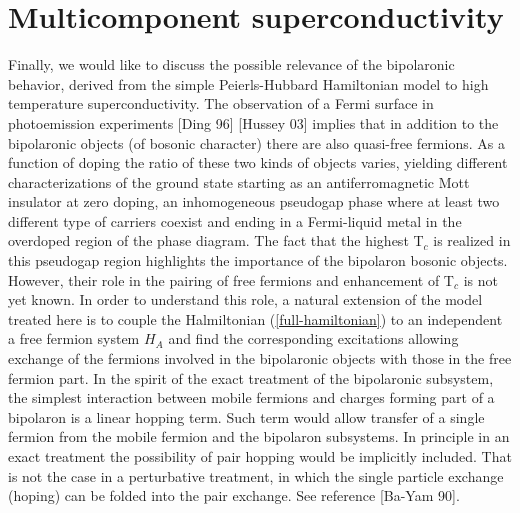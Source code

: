 \section{Multicomponent superconductivity}

Finally, we would like to discuss the possible relevance of the bipolaronic behavior, derived from the simple Peierls-Hubbard Hamiltonian model to high temperature superconductivity. The observation of a Fermi surface in photoemission experiments [Ding 96] [Hussey 03] implies that in addition to the bipolaronic objects (of bosonic character) there are also quasi-free fermions. As a function of doping the ratio of these two kinds of objects varies, yielding different characterizations of the ground state starting as an antiferromagnetic Mott insulator at zero doping, an inhomogeneous pseudogap phase where at least two different type of carriers coexist and ending in a Fermi-liquid metal in the overdoped region of the phase diagram. The fact that the highest T$_c$  is realized in this pseudogap region highlights the importance of the bipolaron bosonic objects. However, their role in the pairing of free fermions and enhancement of T$_c$ is not yet known. In order to understand this role, a natural extension of the model treated here is to couple the Halmiltonian  (\ref{full-hamiltonian}) to an independent a free fermion system $H_A$ and find the corresponding excitations allowing exchange of the fermions involved in the bipolaronic objects with those in the free fermion part. In the spirit of the exact treatment of the bipolaronic subsystem,  the simplest interaction between mobile fermions and charges forming part of a bipolaron is a linear hopping term. Such term would allow transfer of a single fermion from the mobile fermion and the bipolaron subsystems.  In principle in an exact treatment the possibility of pair hopping would be implicitly included. That is not the case in a perturbative treatment, in which the single particle exchange (hoping) can be folded into the pair exchange. See reference [Ba-Yam 90].

